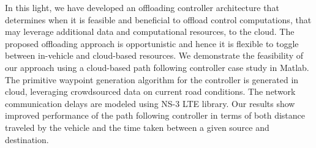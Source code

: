 In this light, we have developed an offloading controller architecture that determines when it is feasible and beneficial to offload control computations, that may leverage additional data and computational resources, to the cloud. The proposed offloading approach is opportunistic and hence it is flexible to toggle between in-vehicle and cloud-based resources. We demonstrate the feasibility of our approach using a cloud-based path following controller case study in Matlab. The primitive waypoint generation algorithm for the controller is generated in cloud, leveraging crowdsourced data on current road conditions.  The network communication delays are modeled using NS-3 LTE library. Our results show improved performance of the path following controller in terms of both distance traveled by the vehicle and the time taken between a given source and destination.